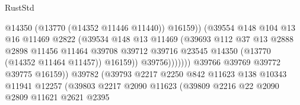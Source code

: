 \begin{lexlean}{RustStd}
\begin{coremodule}
                                              @14350
                                              (@13770 (@14352 @11446 @11440))
                                              @16159))
                                          (@39554
                                            @148
                                            @104
                                            @13
                                            @16
                                            @11469
                                            @2822
                                            (@39534
                                              @148
                                              @13
                                              @11469
                                              (@39693
                                                @112
                                                @37
                                                @13
                                                @2888
                                                @2898
                                                @11456
                                                @11464
                                                @39708
                                                @39712
                                                @39716
                                                @23545
                                                @14350
                                                (@13770 (@14352 @11464 @11457))
                                                @16159))
                                            @39756)))))))
                              @39766
                              @39769
                              @39772
                              @39775
                              @16159))
                          @39782
                          (@39793
                            @2217
                            @2250
                            @842
                            @11623
                            @138
                            @10343
                            @11941
                            @12257
                            (@39803
                              @2217
                              @2090
                              @11623
                              (@39809
                                @2216
                                @22
                                @2090
                                @2809
                                @11621
                                @2621
                                @2395

\end{coremodule}
\end{lexlean}
